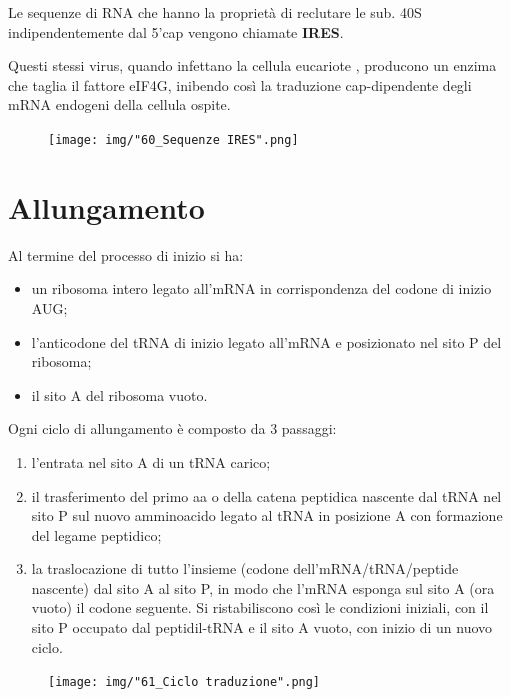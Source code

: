 \documentclass[11pt]{book}
\begin{document}
Le sequenze di RNA che hanno la proprietà di reclutare le sub. 40S
indipendentemente dal 5'cap vengono chiamate \textbf{IRES}.

Questi stessi virus, quando infettano la cellula eucariote , producono
un enzima che taglia il fattore eIF4G, inibendo così la traduzione
cap-dipendente degli mRNA endogeni della cellula ospite.

\begin{figure}[htp]
\centering
\texttt{[image: img/"60\_Sequenze IRES".png]}
\caption{}
\label{sequenze-ires}
\end{figure}

\section{Allungamento}\label{allungamento}

Al termine del processo di inizio si ha:

\begin{itemize}
\itemsep1pt\parskip0pt
\item
  un ribosoma intero legato all'mRNA in corrispondenza del codone di
  inizio AUG;
\item
  l'anticodone del tRNA di inizio legato all'mRNA e posizionato nel sito
  P del ribosoma;
\item
  il sito A del ribosoma vuoto.
\end{itemize}

Ogni ciclo di allungamento è composto da 3 passaggi:

\begin{enumerate}
\def\labelenumi{\arabic{enumi}.}
\itemsep1pt\parskip0pt
\item
  l'entrata nel sito A di un tRNA carico;
\item
  il trasferimento del primo aa o della catena peptidica nascente dal
  tRNA nel sito P sul nuovo amminoacido legato al tRNA in posizione A
  con formazione del legame peptidico;
\item
  la traslocazione di tutto l'insieme (codone dell'mRNA/tRNA/peptide
  nascente) dal sito A al sito P, in modo che l'mRNA esponga sul sito A
  (ora vuoto) il codone seguente. Si ristabiliscono così le condizioni
  iniziali, con il sito P occupato dal peptidil-tRNA e il sito A vuoto,
  con inizio di un nuovo ciclo.
\end{enumerate}

\begin{figure}[htp]
\centering
\texttt{[image: img/"61\_Ciclo traduzione".png]}
\caption{}
\label{ciclo-traduzione}
\end{figure}
\end{document}
